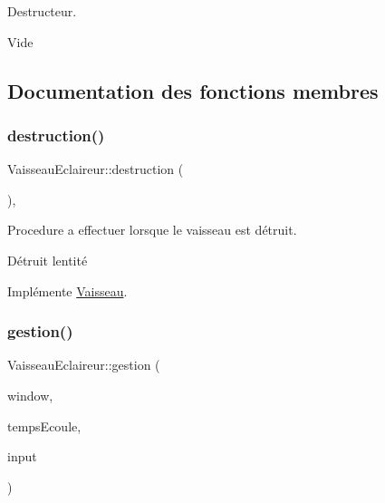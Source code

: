Destructeur. 

Vide 

\subsection{Documentation des fonctions membres}
\mbox{\label{class_vaisseau_eclaireur_a4f65343b67301d7fa98f5e02337cc1e1}} 
\subsubsection{\texorpdfstring{destruction()}{destruction()}}
{\footnotesize\ttfamily Vaisseau\+Eclaireur\+::destruction (\begin{DoxyParamCaption}{ }\end{DoxyParamCaption})\hspace{0.3cm}{\ttfamily [inline]}, {\ttfamily [virtual]}}



Procedure a effectuer lorsque le vaisseau est détruit. 

Détruit l\textquotesingle{}entité 

Implémente \hyperlink{class_vaisseau_af4f490c5fd9e171b23067ec73aa737ad}{Vaisseau}.

\mbox{\label{class_vaisseau_eclaireur_aac6158ee2ff8454a93515546cb1be1de}} 
\subsubsection{\texorpdfstring{gestion()}{gestion()}}
{\footnotesize\ttfamily Vaisseau\+Eclaireur\+::gestion (\begin{DoxyParamCaption}\item[{sf\+::\+Render\+Window \&}]{window,  }\item[{sf\+::\+Time}]{temps\+Ecoule,  }\item[{\hyperlink{_input_8h_a5588d60d674991c719a8df848313e966}{Input} \&}]{input }\end{DoxyParamCaption})\hspace{0.3cm}{\ttfamily [virtual]}}



